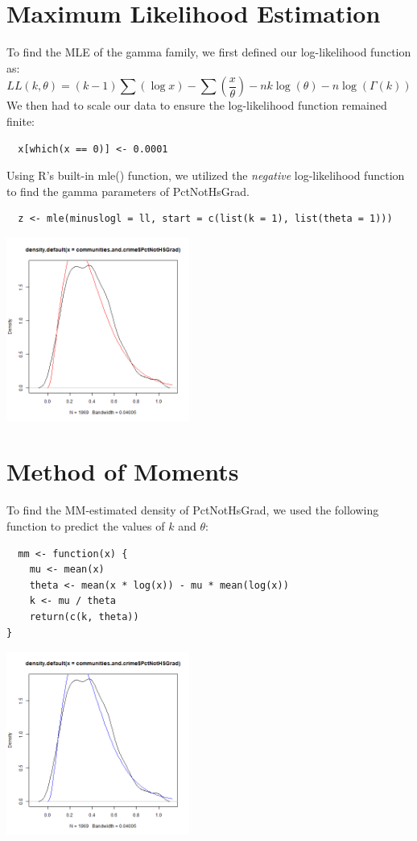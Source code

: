 \documentclass[12pt, letterpaper]{report}
\begin{document}
\pagebreak
\section{Maximum Likelihood Estimation}
To find the MLE of the gamma family, we first defined our log-likelihood function as:
\begin{equation}
  LL(k, \theta) = (k-1)\sum(\log{x}) - \sum(\frac{x}{\theta}) - n k \log{(\theta)} - n \log{(\Gamma(k))}
\end{equation}
We then had to scale our data to ensure the log-likelihood function remained finite: 
\begin{lstlisting}
  x[which(x == 0)] <- 0.0001  
\end{lstlisting} 

Using R's built-in mle() function, we utilized the \textit{negative} log-likelihood function to find the gamma parameters of PctNotHsGrad.
\begin{lstlisting}
  z <- mle(minuslogl = ll, start = c(list(k = 1), list(theta = 1)))
\end{lstlisting} 

\begin{center}
\includegraphics[width=0.45\textwidth]{gamma/PctNotHsGrad_mle}
\end{center}

\pagebreak
\section{Method of Moments}
To find the MM-estimated density of PctNotHsGrad, we used the following function to predict the values of $k$ and $\theta$:
\begin{lstlisting}
  mm <- function(x) {
    mu <- mean(x)
    theta <- mean(x * log(x)) - mu * mean(log(x))
    k <- mu / theta
    return(c(k, theta))
}
\end{lstlisting}

\begin{center}
\includegraphics[width=0.45\textwidth]{gamma/PctNotHsGrad_mm}
\end{center}
\end{document}
